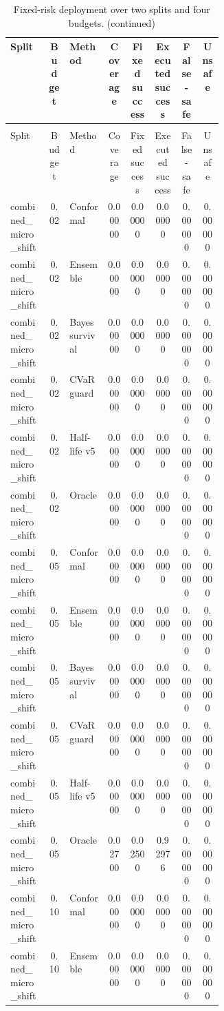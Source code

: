 \documentclass{article}
\begin{document}
\begin{center}
\scriptsize
\begin{longtable}{p{0.18\linewidth}cp{0.18\linewidth}ccccc}
\caption{Fixed-risk deployment over two splits and four budgets.}\label{tab:fixed-risk}\\
\toprule
Split & Budget & Method & Coverage & Fixed success & Executed success & False-safe & Unsafe\\
\midrule
\endfirsthead
\caption[]{Fixed-risk deployment over two splits and four budgets. (continued)}\\
\toprule
Split & Budget & Method & Coverage & Fixed success & Executed success & False-safe & Unsafe\\
\midrule
\endhead
combined\_micro\_shift & 0.02 & Conformal & 0.00000 & 0.00000 & 0.00000 & 0.00000 & 0.00000\\
combined\_micro\_shift & 0.02 & Ensemble & 0.00000 & 0.00000 & 0.00000 & 0.00000 & 0.00000\\
combined\_micro\_shift & 0.02 & Bayes survival & 0.00000 & 0.00000 & 0.00000 & 0.00000 & 0.00000\\
combined\_micro\_shift & 0.02 & CVaR guard & 0.00000 & 0.00000 & 0.00000 & 0.00000 & 0.00000\\
combined\_micro\_shift & 0.02 & Half-life v5 & 0.00000 & 0.00000 & 0.00000 & 0.00000 & 0.00000\\
combined\_micro\_shift & 0.02 & Oracle & 0.00000 & 0.00000 & 0.00000 & 0.00000 & 0.00000\\
combined\_micro\_shift & 0.05 & Conformal & 0.00000 & 0.00000 & 0.00000 & 0.00000 & 0.00000\\
combined\_micro\_shift & 0.05 & Ensemble & 0.00000 & 0.00000 & 0.00000 & 0.00000 & 0.00000\\
combined\_micro\_shift & 0.05 & Bayes survival & 0.00000 & 0.00000 & 0.00000 & 0.00000 & 0.00000\\
combined\_micro\_shift & 0.05 & CVaR guard & 0.00000 & 0.00000 & 0.00000 & 0.00000 & 0.00000\\
combined\_micro\_shift & 0.05 & Half-life v5 & 0.00000 & 0.00000 & 0.00000 & 0.00000 & 0.00000\\
combined\_micro\_shift & 0.05 & Oracle & 0.02700 & 0.02500 & 0.92976 & 0.00000 & 0.00000\\
combined\_micro\_shift & 0.10 & Conformal & 0.00000 & 0.00000 & 0.00000 & 0.00000 & 0.00000\\
combined\_micro\_shift & 0.10 & Ensemble & 0.00000 & 0.00000 & 0.00000 & 0.00000 & 0.00000\\

\end{longtable}
\end{center}
\end{document}
